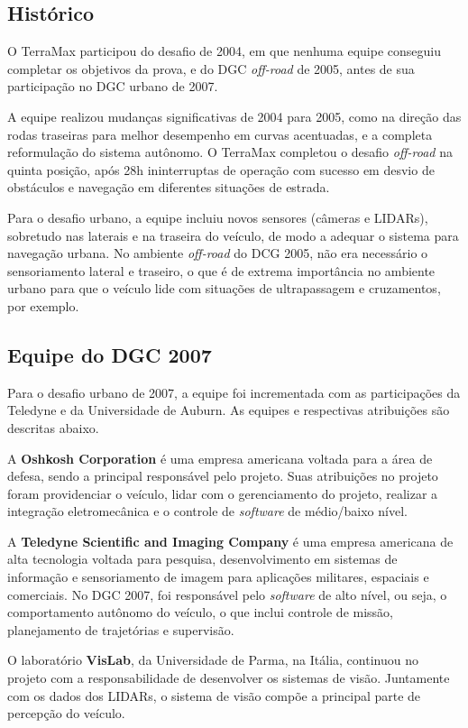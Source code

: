 \subsection{Histórico}

O TerraMax participou do desafio de 2004, em que nenhuma equipe conseguiu completar os objetivos da prova, e do DGC \emph{off-road} de 2005, antes de sua participação no DGC urbano de 2007.

A equipe realizou mudanças significativas de 2004 para 2005, como na direção das rodas traseiras para melhor desempenho em curvas acentuadas, e a completa reformulação do sistema autônomo. O TerraMax completou o desafio \emph{off-road} na quinta posição, após 28h ininterruptas de operação com sucesso em desvio de obstáculos e navegação em diferentes situações de estrada.

Para o desafio urbano, a equipe incluiu novos sensores (câmeras e LIDARs), sobretudo nas laterais e na traseira do veículo, de modo a adequar o sistema para navegação urbana. No ambiente \emph{off-road} do DCG 2005, não era necessário o sensoriamento lateral e traseiro, o que é de extrema importância no ambiente urbano para que o veículo lide com situações de ultrapassagem e cruzamentos, por exemplo.

\subsection{Equipe do DGC 2007}

Para o desafio urbano de 2007, a equipe foi incrementada com as participações da Teledyne e da Universidade de Auburn. As equipes e respectivas atribuições são descritas abaixo.

A \textbf{Oshkosh Corporation} é uma empresa americana voltada para a área de defesa, sendo a principal responsável pelo projeto. Suas atribuições no projeto foram providenciar o veículo, lidar com o gerenciamento do projeto, realizar a integração eletromecânica e o controle de \emph{software} de médio/baixo nível.

A \textbf{Teledyne Scientific and Imaging Company} é uma empresa americana de alta tecnologia voltada para pesquisa, desenvolvimento em sistemas de informação e sensoriamento de imagem para aplicações militares, espaciais e comerciais. No DGC 2007, foi responsável pelo \emph{software} de alto nível, ou seja, o comportamento autônomo do veículo, o que inclui controle de missão, planejamento de trajetórias e supervisão.

O laboratório \textbf{VisLab}, da Universidade de Parma, na Itália, continuou no projeto com a responsabilidade de desenvolver os sistemas de visão. Juntamente com os dados dos LIDARs, o sistema de visão compõe a principal parte de percepção do veículo.

